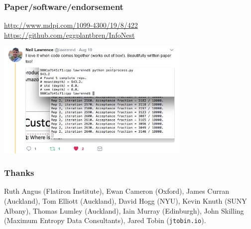 \documentclass{beamer}
\begin{document}
\begin{frame}
\frametitle{Paper/software/endorsement}

{\color{blue}\url{http://www.mdpi.com/1099-4300/19/8/422}
\url{https://github.com/eggplantbren/InfoNest}}
\vspace{0.5cm}

\begin{center}
\includegraphics[width=0.7\textwidth]{lawrence.png}
\end{center}

\end{frame}



\begin{frame}
\frametitle{Thanks}


Ruth Angus (Flatiron Institute),
Ewan Cameron (Oxford), James Curran (Auckland), Tom Elliott (Auckland),
David Hogg (NYU), Kevin Knuth (SUNY Albany),
Thomas Lumley (Auckland),
Iain Murray (Edinburgh), John Skilling
(Maximum Entropy Data Consultants), Jared Tobin ({\tt jtobin.io}).


\end{frame}












\end{document}
